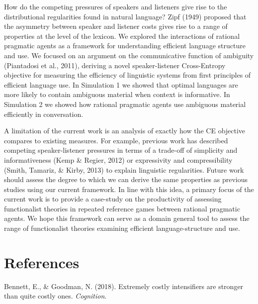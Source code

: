 \documentclass[10pt, letterpaper]{article}
\begin{document}
How do the competing pressures of speakers and listeners give rise to
the distributional regularities found in natural language? Zipf (1949)
proposed that the asymmetry between speaker and listener costs gives
rise to a range of properties at the level of the lexicon. We explored
the interactions of rational pragmatic agents as a framework for
understanding efficient language structure and use. We focused on an
argument on the communicative function of ambiguity (Piantadosi et al.,
2011), deriving a novel speaker-listener Cross-Entropy objective for
measuring the efficiency of linguistic systems from first principles of
efficient language use. In Simulation 1 we showed that optimal languages
are more likely to contain ambiguous material when context is
informative. In Simulation 2 we showed how rational pragmatic agents use
ambiguous material efficiently in conversation.\par

A limitation of the current work is an analysis of exactly how the CE
objective compares to existing measures. For example, previous work has
described competing speaker-listener pressures in terms of a trade-off
of simplicity and informativeness (Kemp \& Regier, 2012) or expressivity
and compressibility (Smith, Tamariz, \& Kirby, 2013) to explain
linguistic regularities. Future work should assess the degree to which
we can derive the same properties as previous studies using our current
framework. In line with this idea, a primary focus of the current work
is to provide a case-study on the productivity of assessing
functionalist theories in repeated reference games between rational
pragmatic agents. We hope this framework can serve as a domain general
tool to assess the range of functionalist theories examining efficient
language-structure and use.\par

\vspace{1em}

\vspace{1em} \noindent

\section{References}\label{references}

\setlength{\parindent}{-0.1in} \setlength{\leftskip}{0.125in} \noindent

\hypertarget{refs}{}
\hypertarget{ref-BennettGoodman2015a}{}
Bennett, E., \& Goodman, N. (2018). Extremely costly intensifiers are
stronger than quite costly ones. \emph{Cognition}.
\end{document}
